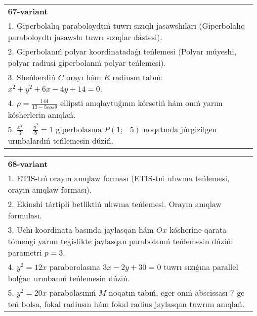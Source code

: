 \documentclass{article}
\begin{document}
\begin{tabular}{m{17cm}}
\textbf{67-variant}\\
1. Giperbolalıq paraboloydtıń tuwrı sızıqlı jasawshıları (Giperbolalıq paraboloydtı jasawshı tuwrı sızıqlar dástesi).\\

2. Giperbolanıń polyar koordinatadaǵı teńlemesi (Polyar múyeshi, polyar radiusi giperbolanıń polyar teńlemesi).\\

3. Sheńberdiń $C$ orayı hám $R$ radiusın tabıń: $x^2+y^2+6 x-4 y+14=0$.\\

4. $\rho = \frac{144}{13 - 5cos\theta}$ ellipsti anıqlaytuǵının kórsetiń hám onıń yarım kósherlerin anıqlań.\\

5. $\frac{x^{2}}{3} - \frac{y^{2}}{5} = 1$ giperbolasına $P(1; - 5)$ noqatında júrgizilgen urınbalardıń teńlemesin dúziń.
\end{tabular}
\vspace{1cm}


\begin{tabular}{m{17cm}}
\textbf{68-variant}\\
1. ETIS-tıń orayın anıqlaw forması (ETIS-tıń ulıwma teńlemesi, orayın anıqlaw forması).\\

2. Ekinshi tártipli betliktiń ulıwma teńlemesi. Orayın anıqlaw formulası.\\

3. Uchı koordinata basında jaylasqan hám $Ox$ kósherine qarata tómengi yarım tegislikte jaylasqan parabolanıń teńlemesin dúziń: parametri $p=3$.\\

4. $y^{2} = 12x$ paraborolasına $3x - 2y + 30 = 0$ tuwrı sızıǵına parallel bolǵan urınbanıń teńlemesin dúziń.  \\

5. $y^{2} = 20x$ parabolasınıń $M$ noqatın tabıń, eger onıń abscissası 7 ge teń bolsa, fokal radiusın hám fokal radius jaylasqan tuwrını anıqlań.
\end{tabular}
\vspace{1cm}
\end{document}
